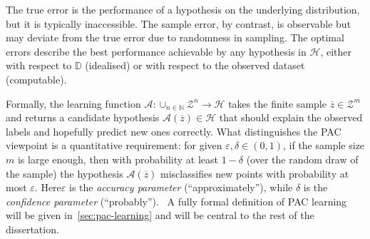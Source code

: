 \medskip

The true error is the performance of a hypothesis on the underlying distribution, but it is typically inaccessible.
The sample error, by contrast, is observable but may deviate from the true error due to randomness in sampling.
The optimal errors describe the best performance achievable by any hypothesis in $\mathcal{H}$, either with respect to $\mathbb{D}$ (idealised) or with respect to the observed dataset (computable).

\medskip

Formally, the learning function $\mathcal{A}: \cup_{n \in \mathbb{N}} \mathcal{Z}^n \to \mathcal{H}$ takes the finite sample $\overline{z} \in \mathcal{Z}^m$ and returns a candidate hypothesis $\mathcal{A}(\overline{z}) \in \mathcal{H}$ that should explain the observed labels and hopefully predict new ones correctly. What distinguishes the PAC viewpoint is a quantitative requirement: for given $\varepsilon,\delta\in(0,1)$, if the sample size $m$ is large enough, then with probability at least $1-\delta$ (over the random draw of the sample) the hypothesis $\mathcal{A}(\overline{z})$ misclassifies new points with probability at most $\varepsilon$. Here$\varepsilon$ is the \emph{accuracy parameter} (“approximately”),
while $\delta$ is the \emph{confidence parameter} (“probably”).~\cite[Sec 3.1, p.43]{UnderstandinMachineLearning}
A fully formal definition of PAC learning will be given in~\ref{sec:pac-learning} and will be central to the rest of the dissertation.






